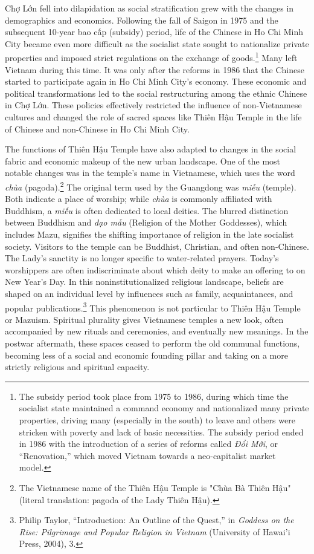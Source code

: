 Chợ Lớn fell into dilapidation as social stratification grew with the changes in demographics and economics. Following the fall of Saigon in 1975 and the subsequent 10-year bao cấp (subsidy) period, life of the Chinese in Ho Chi Minh City became even more difficult as the socialist state sought to nationalize private properties and imposed strict regulations on the exchange of goods.\footnote{The subsidy period took place from 1975 to 1986, during which time the socialist state maintained a command economy and nationalized many private properties, driving many (especially in the south) to leave and others were stricken with poverty and lack of basic necessities. The subsidy period ended in 1986 with the introduction of a series of reforms called \textit{Đổi Mới}, or “Renovation,” which moved Vietnam towards a neo-capitalist market model.} Many left Vietnam during this time. It was only after the reforms in 1986 that the Chinese started to participate again in Ho Chi Minh City’s economy. These economic and political transformations led to the social restructuring among the ethnic Chinese in Chợ Lớn. These policies effectively restricted the influence of non-Vietnamese cultures and changed the role of sacred spaces like Thiên Hậu Temple in the life of Chinese and non-Chinese in Ho Chi Minh City.

The functions of Thiên Hậu Temple have also adapted to changes in the social fabric and economic makeup of the new urban landscape. One of the most notable changes was in the temple's name in Vietnamese, which uses the word \textit{chùa} (pagoda).\footnote{The Vietnamese name of the Thiên Hậu Temple is "Chùa Bà Thiên Hậu" (literal translation: pagoda of the Lady Thiên Hậu).} The original term used by the Guangdong was \textit{miếu} (temple). Both indicate a place of worship; while \textit{chùa} is commonly affiliated with Buddhism, a \textit{miếu} is often dedicated to local deities. The blurred distinction between Buddhism and \textit{đạo mẫu} (Religion of the Mother Goddesses), which includes Mazu, signifies the shifting importance of religion in the late socialist society. Visitors to the temple can be Buddhist, Christian, and often non-Chinese. The Lady’s sanctity is no longer specific to water-related prayers. Today’s worshippers are often indiscriminate about which deity to make an offering to on New Year’s Day. In this noninstitutionalized religious landscape, beliefs are shaped on an individual level by influences such as family, acquaintances, and popular publications.\footnote{Philip Taylor, “Introduction: An Outline of the Quest,” in \textit{Goddess on the Rise: Pilgrimage and Popular Religion in Vietnam} (University of Hawai’i Press, 2004), 3.} This phenomenon is not particular to Thiên Hậu Temple or Mazuism. Spiritual plurality gives Vietnamese temples a new look, often accompanied by new rituals and ceremonies, and eventually new meanings. In the postwar aftermath, these spaces ceased to perform the old communal functions, becoming less of a social and economic founding pillar and taking on a more strictly religious and spiritual capacity.


